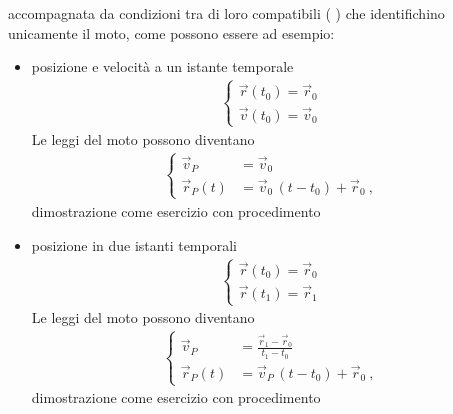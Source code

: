 \documentclass[letterpaper,10pt,italian]{jupyterBook}
\begin{document}
\sphinxAtStartPar
accompagnata da condizioni tra di loro compatibili ( ) che identifichino unicamente il moto, come possono essere ad esempio:
\begin{itemize}
\item {} 
\sphinxAtStartPar
posizione e velocità a un istante temporale
\begin{equation*}
\begin{split}\begin{cases}
    \vec{r}(t_0) = \vec{r}_0 \\
    \vec{v}(t_0) = \vec{v}_0
  \end{cases}\end{split}
\end{equation*}
\sphinxAtStartPar
Le leggi del moto possono diventano
\begin{equation*}
\begin{split}\begin{cases}
    \vec{v}_P    & = \vec{v}_0  \\
    \vec{r}_P(t) & = \vec{v}_0 \, ( t - t_0 ) + \vec{r}_0 \ ,
  \end{cases}\end{split}
\end{equation*}
\sphinxAtStartPar
{} dimostrazione come esercizio con procedimento

\item {} 
\sphinxAtStartPar
posizione in due istanti temporali
\begin{equation*}
\begin{split}\begin{cases}
    \vec{r}(t_0) = \vec{r}_0 \\
    \vec{r}(t_1) = \vec{r}_1
  \end{cases}\end{split}
\end{equation*}
\sphinxAtStartPar
Le leggi del moto possono diventano
\begin{equation*}
\begin{split}\begin{cases}
    \vec{v}_P    & = \frac{\vec{r}_1 - \vec{r}_0}{t_1 - t_0} \\
    \vec{r}_P(t) & = \vec{v}_P \, ( t - t_0 ) + \vec{r}_0 \ ,
  \end{cases}\end{split}
\end{equation*}
\sphinxAtStartPar
{} dimostrazione come esercizio con procedimento

\end{itemize}
\end{document}
